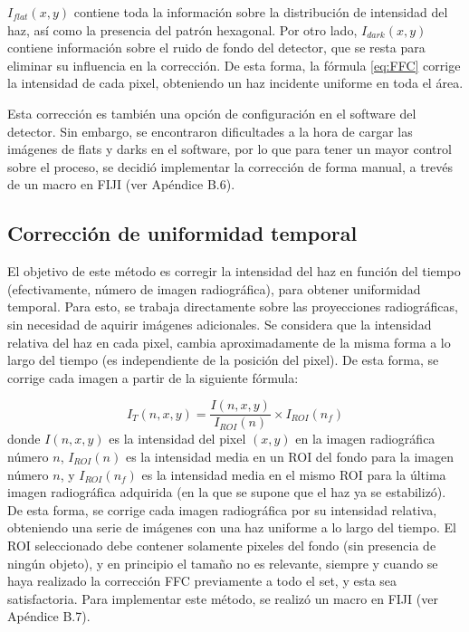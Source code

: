 $I_{flat}(x,y)$ contiene toda la información sobre la distribución de intensidad del haz, así como
la presencia del patrón hexagonal. Por otro lado, $I_{dark}(x,y)$ contiene información sobre el
ruido de fondo del detector, que se resta para eliminar su influencia en la corrección. De esta forma,
la fórmula \ref{eq:FFC} corrige la intensidad de cada pixel, obteniendo un haz incidente uniforme
en toda el área. 

Esta corrección es también una opción de configuración en el software del detector. Sin embargo, se encontraron dificultades
a la hora de cargar las imágenes de flats y darks en el software, por lo que para tener un mayor
control sobre el proceso, se decidió implementar la corrección de forma manual, a trevés de un
macro en FIJI (ver Apéndice B.6).

\subsection{Corrección de uniformidad temporal}

El objetivo de este método es corregir la intensidad del haz en función del tiempo (efectivamente,
número de imagen radiográfica), para obtener uniformidad temporal. Para esto, se trabaja directamente
sobre las proyecciones radiográficas, sin necesidad de aquirir imágenes adicionales.
Se considera que la intensidad relativa del haz en cada pixel, cambia aproximadamente de la misma
forma a lo largo del tiempo (es independiente de la posición del pixel). De esta forma, se corrige
cada imagen a partir de la siguiente fórmula:

\begin{equation}
    I_{T}(n,x,y) = \dfrac{I(n,x,y)}{I_{ROI}(n)} \times I_{ROI}(n_f)
    \label{eq:corr_temporal}
\end{equation}
donde $I(n,x,y)$ es la intensidad del pixel $(x,y)$ en la imagen radiográfica número $n$, $I_{ROI}(n)$
es la intensidad media en un ROI del fondo para la imagen número $n$, y $I_{ROI}(n_f)$ es la intensidad
media en el mismo ROI para la última imagen radiográfica adquirida (en la que se supone que el haz ya
se estabilizó). De esta forma, se corrige cada imagen radiográfica por su intensidad relativa,
obteniendo una serie de imágenes con una haz uniforme a lo largo del tiempo. El ROI seleccionado
debe contener solamente pixeles del fondo (sin presencia de ningún objeto), y en principio el tamaño
no es relevante, siempre y cuando se haya realizado la corrección FFC previamente a todo el set, y
esta sea satisfactoria.
Para implementar este método, se realizó un macro en FIJI (ver Apéndice B.7).

